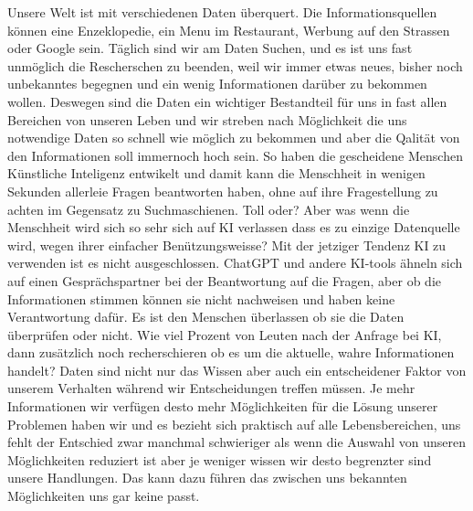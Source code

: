 \documentclass{article}
\begin{document}
Unsere Welt ist mit verschiedenen Daten überquert. Die Informationsquellen können eine Enzeklopedie, ein Menu im Restaurant, Werbung auf den Strassen oder Google sein.
Täglich sind wir am Daten Suchen, und es ist uns fast unmöglich die Rescherschen zu beenden, weil wir immer etwas neues, bisher noch unbekanntes 
begegnen und ein wenig Informationen darüber zu bekommen wollen.
Deswegen sind die Daten ein wichtiger Bestandteil für uns in fast allen Bereichen von unseren Leben 
und wir streben nach Möglichkeit die uns notwendige Daten so schnell wie möglich zu bekommen 
und aber die Qalität von den Informationen soll immernoch hoch sein. So haben die gescheidene Menschen Künstliche Inteligenz
entwikelt und damit kann die Menschheit in wenigen Sekunden allerleie Fragen beantworten haben, ohne auf ihre Fragestellung zu achten im Gegensatz zu Suchmaschienen.
Toll oder? Aber was wenn die Menschheit wird sich so sehr sich auf KI verlassen 
dass es zu einzige Datenquelle wird, wegen ihrer einfacher Benützungsweisse? Mit der jetziger Tendenz KI zu verwenden ist es nicht ausgeschlossen. ChatGPT und andere KI-tools ähneln sich auf einen Gesprächspartner bei der Beantwortung auf die Fragen, aber ob die Informationen stimmen können sie nicht nachweisen und haben keine Verantwortung dafür. 
Es ist den Menschen überlassen 
ob sie die Daten überprüfen oder nicht. Wie viel Prozent von Leuten nach der Anfrage bei KI, dann zusätzlich noch recherschieren ob es um die aktuelle, wahre Informationen handelt? Daten sind nicht nur das Wissen aber auch ein entscheidener Faktor von unserem Verhalten während wir Entscheidungen treffen müssen.
Je mehr Informationen wir verfügen desto mehr Möglichkeiten für die Lösung unserer Problemen haben wir und es bezieht sich praktisch auf alle Lebensbereichen, uns fehlt der Entschied zwar manchmal schwieriger als wenn die Auswahl von unseren Möglichkeiten reduziert ist aber je weniger wissen wir desto begrenzter sind unsere Handlungen.
Das kann dazu führen das zwischen uns bekannten Möglichkeiten uns gar keine passt. 


\printbibliography
\end{document}

